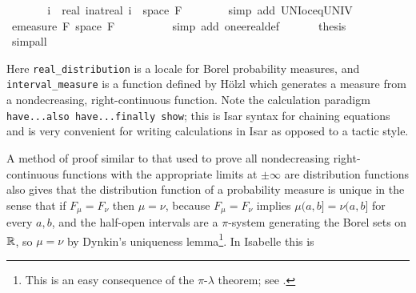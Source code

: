 \documentclass[leqno]{article}
\theoremstyle{definition}
\begin{document}
\begin{isabellebody}
\ \ \ \ \isamarkupfalse%
\ \isamarkupfalse%
\ {\isachardoublequoteopen}{\isacharparenleft}{\isasymUnion}i{\isachardot}\ {\isacharbraceleft}{\isacharminus}\ real\ {\isacharparenleft}i{\isacharcolon}{\isacharcolon}nat{\isacharparenright}{\isacharless}{\isachardot}{\isachardot}real\ i{\isacharbraceright}{\isacharparenright}\ {\isacharequal}\ space\ {\isacharquery}F{\isachardoublequoteclose}\isanewline
\ \ \ \ \ \ \isamarkupfalse%
\ {\isacharparenleft}simp\ add{\isacharcolon}\ UN{\isacharunderscore}Ioc{\isacharunderscore}eq{\isacharunderscore}UNIV{\isacharparenright}\isanewline
\ \ \ \ \isamarkupfalse%
\ \isamarkupfalse%
\ {\isachardoublequoteopen}emeasure\ {\isacharquery}F\ {\isacharparenleft}space\ {\isacharquery}F{\isacharparenright}\ {\isacharequal}\ {}{\isachardoublequoteclose}\isanewline
\ \ \ \ \ \ \isamarkupfalse%
\ {\isacharparenleft}simp\ add{\isacharcolon}\ one{\isacharunderscore}ereal{\isacharunderscore}def{\isacharparenright}\isanewline
\ \ \isamarkupfalse%
\isanewline
\ \ \isamarkupfalse%
\ {\isacharquery}thesis\isanewline
\ \ \ \ \isamarkupfalse%
\ \isamarkupfalse%
\ simp{\isacharunderscore}all\isanewline
{}\isamarkupfalse%
\end{isabellebody}

\medskip

Here \texttt{real\_distribution} is a locale for Borel probability measures, and \texttt{interval\_measure} is a function defined by H\"olzl which generates a measure from a nondecreasing, right-continuous function. Note the calculation paradigm \texttt{have...also have...finally show}; this is Isar syntax for chaining equations and is very convenient for writing calculations in Isar as opposed to a tactic style.

A method of proof similar to that used to prove all nondecreasing right-continuous functions with the appropriate limits at $\pm \infty$ are distribution functions also gives that the distribution function of a probability measure is unique in the sense that if $F_\mu = F_\nu$ then $\mu = \nu$, because $F_\mu = F_\nu$ implies $\mu (a,b] = \nu (a,b]$ for every $a,b$, and the half-open intervals are a $\pi$-system generating the Borel sets on $\mathbb{R}$, so $\mu = \nu$ by Dynkin's uniqueness lemma\footnote{This is an easy consequence of the $\pi$-$\lambda$ theorem; see \cite{billingsley}.}. In Isabelle this is
\end{document}
